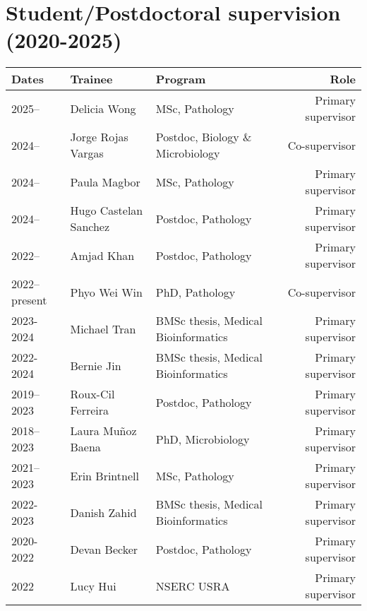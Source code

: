 
\section {Student/Postdoctoral supervision (2020-2025)}

\setlength{\tabcolsep}{6pt}
\begin{tabular}{llp{2.5in}r}
Dates & Trainee & Program & Role\\
\hline

2025-- & Delicia Wong & MSc, Pathology & Primary supervisor\\

2024-- & Jorge Rojas Vargas & Postdoc, Biology \& Microbiology & Co-supervisor\\

2024-- & Paula Magbor & MSc, Pathology & Primary supervisor\\

2024-- & Hugo Castelan Sanchez & Postdoc, Pathology & Primary supervisor\\

2022-- & Amjad Khan & Postdoc, Pathology & Primary supervisor\\

2022--present & Phyo Wei Win & PhD, Pathology & Co-supervisor\\

2023-2024 & Michael Tran & BMSc thesis, Medical Bioinformatics & Primary supervisor\\

2022-2024 & Bernie Jin & BMSc thesis, Medical Bioinformatics & Primary supervisor\\

2019--2023 & Roux-Cil Ferreira & Postdoc, Pathology & Primary supervisor\\

2018--2023 & Laura Mu\~noz Baena & PhD, Microbiology & Primary supervisor\\

2021--2023 & Erin Brintnell & MSc, Pathology & Primary supervisor\\

2022-2023 & Danish Zahid & BMSc thesis, Medical Bioinformatics & Primary supervisor\\

2020-2022 & Devan Becker & Postdoc, Pathology & Primary supervisor\\

2022 & Lucy Hui & NSERC USRA & Primary supervisor\\


\end{tabular}
